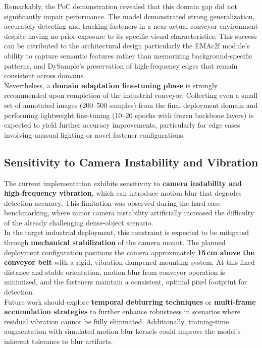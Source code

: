 Remarkably, the PoC demonstration revealed that this domain gap did not significantly impair performance. The model demonstrated strong generalization, accurately detecting and tracking fasteners in a near-actual conveyor environment despite having no prior exposure to its specific visual characteristics. This success can be attributed to the architectural design particularly the EMAc2f module's ability to capture semantic features rather than memorizing background-specific patterns, and DySample's preservation of high-frequency edges that remain consistent across domains.\\

Nevertheless, a \textbf{domain adaptation fine-tuning phase} is strongly recommended upon completion of the industrial conveyor. Collecting even a small set of annotated images (200--500 samples) from the final deployment domain and performing lightweight fine-tuning (10--20 epochs with frozen backbone layers) is expected to yield further accuracy improvements, particularly for edge cases involving unusual lighting or novel fastener configurations.

\subsection{Sensitivity to Camera Instability and Vibration}

The current implementation exhibits sensitivity to \textbf{camera instability and high-frequency vibration}, which can introduce motion blur that degrades detection accuracy. This limitation was observed during the hard case benchmarking, where minor camera instability artificially increased the difficulty of the already challenging dense-object scenario.\\

In the target industrial deployment, this constraint is expected to be mitigated through \textbf{mechanical stabilization} of the camera mount. The planned deployment configuration positions the camera approximately \textbf{15\,cm above the conveyor belt} with a rigid, vibration-dampened mounting system. At this fixed distance and stable orientation, motion blur from conveyor operation is minimized, and the fasteners maintain a consistent, optimal pixel footprint for detection.\\

Future work should explore \textbf{temporal deblurring techniques} or \textbf{multi-frame accumulation strategies} to further enhance robustness in scenarios where residual vibration cannot be fully eliminated. Additionally, training-time augmentation with simulated motion blur kernels could improve the model's inherent tolerance to blur artifacts.

